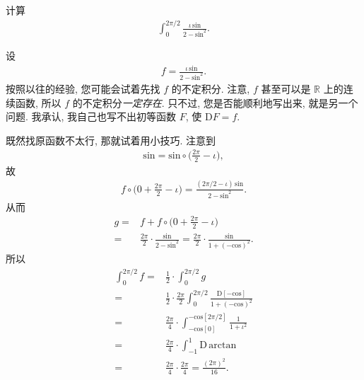 \begin{example}
    计算
    \begin{align*}
        \int_{0}^{2\pi/2} {\frac{\iota \, \mathrm{sin}}{2 - \mathrm{sin}^2}}.
    \end{align*}

    设
    \begin{align*}
        f = \frac{\iota \, \mathrm{sin}}{2 - \mathrm{sin}^2}.
    \end{align*}
    按照以往的经验, 您可能会试着先找 $f$ 的不定积分.
    注意, $f$ 甚至可以是 $\mathbb{R}$ 上的连续函数,
    所以 $f$ 的不定积分\emph{一定存在}.
    只不过, 您是否能顺利地写出来, 就是另一个问题.
    我承认, 我自己也写不出初等函数 $F$, 使 $\mathrm{D}F = f$.

    既然找原函数不太行, 那就试着用小技巧.
    注意到
    \begin{align*}
        \mathrm{sin} = \mathrm{sin} \circ \bigg( \frac{2\pi}{2} - \iota \bigg),
    \end{align*}
    故
    \begin{align*}
        f \circ \bigg(0 + \frac{2\pi}{2} - \iota \bigg) = \frac{(2\pi/2 - \iota) \, \mathrm{sin}}{2 - \mathrm{sin}^2}.
    \end{align*}
    从而
    \begin{align*}
        g
        = {} & f + f \circ \bigg(0 + \frac{2\pi}{2} - \iota \bigg)          \\
        = {} & \frac{2\pi}{2} \cdot \frac{\mathrm{sin}}{2 - \mathrm{sin}^2}
        = \frac{2\pi}{2} \cdot \frac{\mathrm{sin}}{1 + (-\mathrm{cos})^2}.
    \end{align*}
    所以
    \begin{align*}
        \int_{0}^{2\pi/2} {f}
        = {} & \frac{1}{2} \cdot \int_{0}^{2\pi/2} {g}                          \\
        = {} & \frac{1}{2} \cdot \frac{2\pi}{2} \int_{0}^{2\pi/2}
        {\frac{\mathrm{D}[-\mathrm{cos}]}{1 + (-\mathrm{cos})^2}}               \\
        = {} & \frac{2\pi}{4} \cdot
        \int_{-\mathrm{cos}[0]}^{-\mathrm{cos}[2\pi/2]}
        {\frac{1}{1 + \iota^2}}                                                 \\
        = {} & \frac{2\pi}{4} \cdot \int_{-1}^{1} {\mathrm{D}\,\mathrm{arctan}} \\
        = {} & \frac{2\pi}{4} \cdot \frac{2\pi}{4}
        = \frac{(2\pi)^2}{16}.
    \end{align*}
\end{example}
